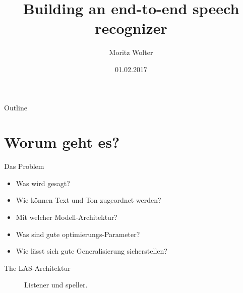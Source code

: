 \documentclass[10pt]{beamer}
\title{Building an end-to-end speech recognizer}
\author{Moritz Wolter}
\date{01.02.2017}
\begin{document}
\begin{frame}
  \titlepage
\end{frame}


\begin{frame}{Outline}
  \tableofcontents
\end{frame}

\section{Worum geht es?}
\begin{frame}{Das Problem}
	\begin{itemize}
		\item Was wird gesagt?
		\item Wie können Text und Ton zugeordnet werden?
		\item Mit welcher Modell-Architektur?
		\item Was sind gute optimierungs-Parameter?
		\item Wie lässt sich gute Generalisierung sicherstellen?
	\end{itemize}
\end{frame}

\begin{frame}{The LAS-Architektur}
	\begin{figure}
		\caption{Listener und speller.}
	\end{figure}
\end{frame}
\end{document}
